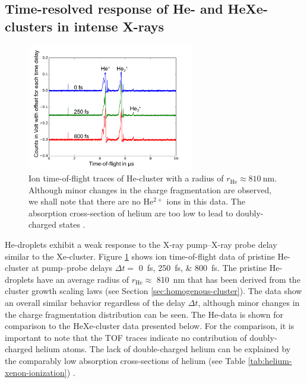 \subsection[Time-resolved response of highly ionized He- and HeXe-clusters]{Time-resolved response of He- and HeXe-clusters in intense X-rays}\label{sec:hexe--and-he-TOF}
\begin{figure}
	\centering
		\includegraphics[width=0.65\textwidth]{images/results/TOF-helium-cluster2.png}
	\caption[Time-resolved answer of He-clusters in TOF spectroscopy.]{Ion time-of-flight traces of He-cluster with a radius of $r_{\text{He}}\approx \SI{810}{\nano\meter}$. Although minor changes in the charge fragmentation are observed, we shall note that there are no He$^{2+}$ ions in this data. The absorption cross-section of helium are too low to lead to doubly-charged states \citep{Ho-2016-PC}.}
	\label{fig:TOF-helium-cluster}
\end{figure}
%
He-droplets exhibit a weak response to the X-ray pump--X-ray probe delay similar to the Xe-cluster. Figure \ref{fig:TOF-helium-cluster} shows ion time-of-flight data of pristine He-cluster at pump--probe delays $\Delta t=$ \SIlist{0;250;800}{\femto\second}. The pristine He-droplets have an average radius of $r_{\text{He}}\approx$ \SI{810}{\nano\meter} that has been derived from the cluster growth scaling laws (see Section \ref{sec:homogenous-cluster}). The data show an overall similar behavior regardless of the delay $\Delta t$, although minor changes in the charge fragmentation distribution can be seen. The He-data is shown for comparison to the HeXe-cluster data presented below. For the comparison, it is important to note that the TOF traces indicate no contribution of doubly-charged helium atoms. The lack of double-charged helium can be explained by the comparably low absorption cross-sections of helium (see Table \ref{tab:helium-xenon-ionization}) \cite{Ho-2016-PC}.\\[1\baselineskip]
